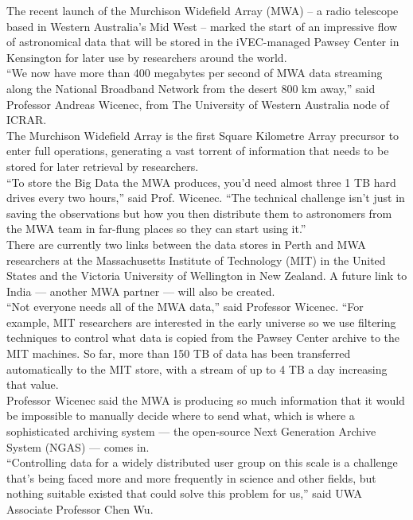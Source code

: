 The recent launch of the Murchison Widefield Array (MWA) – a radio telescope based in Western Australia’s Mid West – marked the start of an impressive flow of astronomical data that will be stored in the iVEC-managed Pawsey Center in Kensington for later use by researchers around the world.\\

“We now have more than 400 megabytes per second of MWA data streaming along the National Broadband Network from the desert 800 km away,” said Professor Andreas Wicenec, from The University of Western Australia node of ICRAR.\\

The Murchison Widefield Array is the first Square Kilometre Array precursor to enter full operations, generating a vast torrent of information that needs to be stored for later retrieval by researchers.\\

“To store the Big Data the MWA produces, you’d need almost three 1 TB hard drives every two hours,” said Prof. Wicenec. “The technical challenge isn’t just in saving the observations but how you then distribute them to astronomers from the MWA team in far-flung places so they can start using it.”\\

There are currently two links between the data stores in Perth and MWA researchers at the Massachusetts Institute of Technology (MIT) in the United States and the Victoria University of Wellington in New Zealand. A future link to India — another MWA partner — will also be created.\\

“Not everyone needs all of the MWA data,” said Professor Wicenec. “For example, MIT researchers are interested in the early universe so we use filtering techniques to control what data is copied from the Pawsey Center archive to the MIT machines. So far, more than 150 TB of data has been transferred automatically to the MIT store, with a stream of up to 4 TB a day increasing that value.\\

Professor Wicenec said the MWA is producing so much information that it would be impossible to manually decide where to send what, which is where a sophisticated archiving system — the open-source Next Generation Archive System (NGAS) — comes in.\\

“Controlling data for a widely distributed user group on this scale is a challenge that’s being faced more and more frequently in science and other fields, but nothing suitable existed that could solve this problem for us,” said UWA Associate Professor Chen Wu.\\

